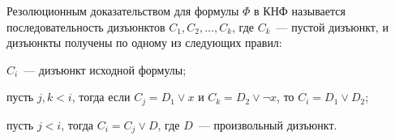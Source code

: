 Резолюционным доказательством для формулы $\Phi$ в КНФ называется последовательность дизъюнктов $C_1, C_2, \dots, C_k$,
где $C_k$~--- пустой дизъюнкт, и дизъюнкты получены по одному из следующих правил:
\begin{itemtask}
    \item $C_i$~--- дизъюнкт исходной формулы;
    \item пусть $j, k < i$, тогда если $C_j = D_1 \lor x$ и $C_k = D_2 \lor \neg x$, то $C_i = D_1 \lor D_2$;
    \item пусть $j < i$, тогда $C_i = C_j \lor D$, где $D$~--- произвольный дизъюнкт.
\end{itemtask}